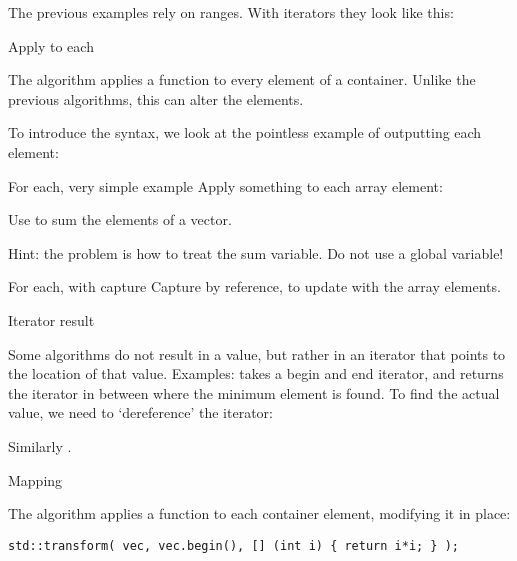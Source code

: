 \begin{remark}
  The previous examples rely on  ranges.
  With iterators they look like this:
\end{remark}

 {Apply to each}

The  algorithm applies a function to every element
of a container.
Unlike the previous algorithms, this can alter the elements.

To introduce the syntax, we look at the pointless example of
outputting each element:

%

\begin{block}{For each, very simple example}
  \label{sl:alg-each}
  Apply something to each array element:
\end{block}

\begin{exercise}
  \label{ex:for-each-sum}
  Use  to sum the elements of a vector.

  Hint: the problem is how to treat the sum variable.
  Do not use a global variable!
\end{exercise}

\begin{block}{For each, with capture}
  \label{sl:alg-summing}
  Capture by reference, to update with the array elements.
\end{block}

 {Iterator result}

Some algorithms do not result in a value, but rather
in an iterator that points to the location of that value.
Examples:  takes a begin and end iterator,
and returns the iterator in between where the minimum element
is found.
To find the actual value, we need to `dereference'
the iterator:
%

Similarly .

 {Mapping}

The  algorithm applies a function to each
container element, modifying it in place:
\begin{lstlisting}
std::transform( vec, vec.begin(), [] (int i) { return i*i; } );
\end{lstlisting}

